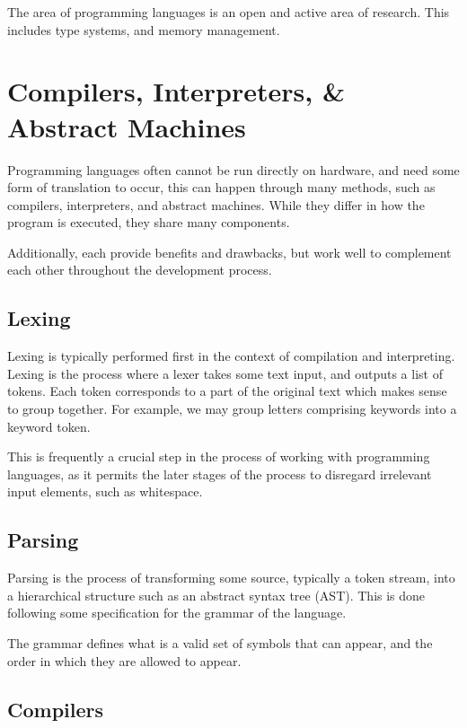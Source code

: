 The area of programming languages is an open and active area of research. This includes type systems, and memory management.

\section{Compilers, Interpreters, \& Abstract Machines}

Programming languages often cannot be run directly on hardware, and need some form of translation to occur, this can happen through many methods, such as compilers, interpreters, and abstract machines.
While they differ in how the program is executed, they share many components.

Additionally, each provide benefits and drawbacks, but work well to complement each other throughout the development process.

\subsection{Lexing}

Lexing is typically performed first in the context of compilation and interpreting. Lexing is the process where a lexer takes some text input, and outputs a list of tokens. Each token corresponds to a part of the original text which makes sense to group together. For example, we may group letters comprising keywords into a keyword token. 

This is frequently a crucial step in the process of working with programming languages, as it permits the later stages of the process to disregard irrelevant input elements, such as whitespace.

\subsection{Parsing}

Parsing is the process of transforming some source, typically a token stream, into a hierarchical structure such as an abstract syntax tree (AST). This is done following some specification for the grammar of the language.

The grammar defines what is a valid set of symbols that can appear, and the order in which they are allowed to appear.


\subsection{Compilers}

